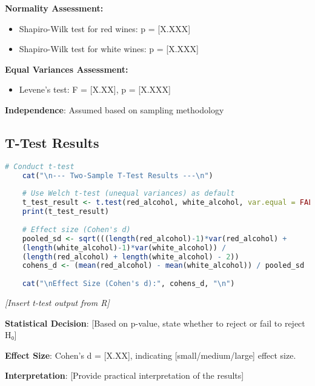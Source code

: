 \textbf{Normality Assessment:}
\begin{itemize}
	\item Shapiro-Wilk test for red wines: p = [X.XXX]
	\item Shapiro-Wilk test for white wines: p = [X.XXX]
\end{itemize}

\textbf{Equal Variances Assessment:}
\begin{itemize}
	\item Levene's test: F = [X.XX], p = [X.XXX]
\end{itemize}

\textbf{Independence}: Assumed based on sampling methodology

\subsection{T-Test Results}

\begin{lstlisting}[language=R, caption=Two-Sample T-Test]
	# Conduct t-test
	cat("\n--- Two-Sample T-Test Results ---\n")
	
	# Use Welch t-test (unequal variances) as default
	t_test_result <- t.test(red_alcohol, white_alcohol, var.equal = FALSE)
	print(t_test_result)
	
	# Effect size (Cohen's d)
	pooled_sd <- sqrt(((length(red_alcohol)-1)*var(red_alcohol) + 
	(length(white_alcohol)-1)*var(white_alcohol)) / 
	(length(red_alcohol) + length(white_alcohol) - 2))
	cohens_d <- (mean(red_alcohol) - mean(white_alcohol)) / pooled_sd
	
	cat("\nEffect Size (Cohen's d):", cohens_d, "\n")
\end{lstlisting}

\textit{[Insert t-test output from R]}

\textbf{Statistical Decision}: 
[Based on p-value, state whether to reject or fail to reject H₀]

\textbf{Effect Size}: Cohen's d = [X.XX], indicating [small/medium/large] effect size.

\textbf{Interpretation}: [Provide practical interpretation of the results]